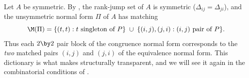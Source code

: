 \begin{remark}\label{rem:compatibility}
  Let $A$ be symmetric.  By , the rank-jump set of $A$
  is symmetric ($\Delta_{ij} = \Delta_{ji}$), and the unsymmetric normal
  form $\Pi$ of $A$ has matching
  \[
    \M(\Pi) = \{(t,t) : t \text{ singleton of } P\}
    \;\cup\;
    \{(i,j), (j,i) : (i,j) \text{ pair of } P\} .
  \]
  Thus each $2 \by 2$ pair block of the congruence normal form corresponds
  to the \emph{two} matched pairs $(i,j)$ and $(j,i)$ of the equivalence
  normal form.  This dictionary is what makes
   structurally transparent, and we will see it again
  in the combinatorial conditions of .
\end{remark}
